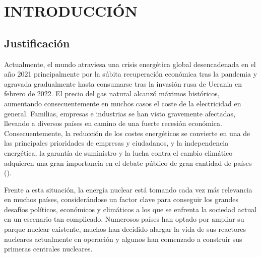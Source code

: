 \section{INTRODUCCIÓN} \label{sec:introduccion}

\subsection{Justificación}

Actualmente, el mundo atraviesa una crisis energética global desencadenada en el año 2021 principalmente por la súbita recuperación económica tras la pandemia y agravada gradualmente hasta consumarse tras la invasión rusa de Ucrania en febrero de 2022. El precio del gas natural alcanzó máximos históricos, aumentando consecuentemente en muchos casos el coste de la electricidad en general. Familias, empresas e industrias se han visto gravemente afectadas, llevando a diversos países en camino de una fuerte recesión económica. Consecuentemente, la reducción de los costes energéticos se convierte en una de las principales prioridades de empresas y ciudadanos, y la independencia energética, la
garantía de suministro y la lucha contra el cambio climático adquieren una gran importancia en el debate público de gran cantidad de países (\cite{crisis_energetica_iea}). 

Frente a esta situación, la energía nuclear está tomando cada vez más relevancia en muchos países, considerándose un factor clave para conseguir los grandes desafíos políticos, económicos y climáticos  a los que se enfrenta la sociedad actual en un escenario tan complicado. Numerosos países han optado por ampliar su parque nuclear existente, muchos han decidido alargar la vida de sus reactores nucleares actualmente en operación y algunos han comenzado a construir sus primeras centrales nucleares. 

